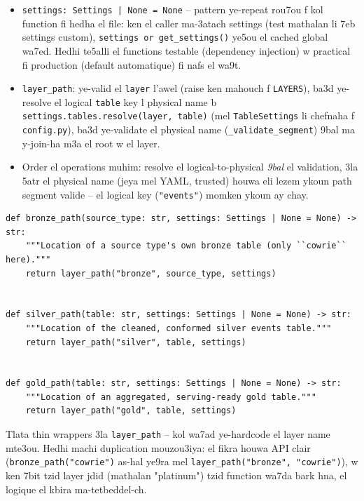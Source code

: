 \documentclass[11pt,a4paper]{report}
\DeclareRobustCommand{\code}[1]{\texttt{#1}}
\begin{document}
\begin{itemize}
  \item \code{settings: Settings | None = None} -- pattern ye-repeat rou7ou
        f kol function fi hedha el file: ken el caller ma-3atach settings
        (test mathalan li 7eb settings custom), \code{settings or
        get\_settings()} ye5ou el cached global wa7ed. Hedhi te5alli el
        functions testable (dependency injection) w practical fi production
        (default automatique) fi nafs el wa9t.
  \item \code{layer\_path}: ye-valid el \code{layer} l'awel (raise ken mahouch
        f \code{LAYERS}), ba3d ye-resolve el logical \code{table} key l
        physical name b \code{settings.tables.resolve(layer, table)} (mel
        \code{TableSettings} li chefnaha f \code{config.py}), ba3d ye-validate
        el physical name (\code{\_validate\_segment}) 9bal ma y-join-ha m3a
        el root w el layer.
  \item Order el operations muhim: resolve el logical-to-physical \emph{9bal}
        el validation, 3la 5atr el physical name (jeya mel YAML, trusted) houwa
        eli lezem ykoun path segment valide -- el logical key (\code{"events"})
        momken ykoun ay chay.
\end{itemize}

\begin{lstlisting}[style=pystyle]
def bronze_path(source_type: str, settings: Settings | None = None) -> str:
    """Location of a source type's own bronze table (only ``cowrie`` here)."""
    return layer_path("bronze", source_type, settings)


def silver_path(table: str, settings: Settings | None = None) -> str:
    """Location of the cleaned, conformed silver events table."""
    return layer_path("silver", table, settings)


def gold_path(table: str, settings: Settings | None = None) -> str:
    """Location of an aggregated, serving-ready gold table."""
    return layer_path("gold", table, settings)
\end{lstlisting}

Tlata thin wrappers 3la \code{layer\_path} -- kol wa7ad ye-hardcode el layer
name mte3ou. Hedhi machi duplication mouzou3iya: el fikra houwa API clair
(\code{bronze\_path("cowrie")} as-hal ye9ra mel \code{layer\_path("bronze",
"cowrie")}), w ken 7bit tzid layer jdid (mathalan "platinum") tzid function
wa7da bark hna, el logique el kbira ma-tetbeddel-ch.
\end{document}
